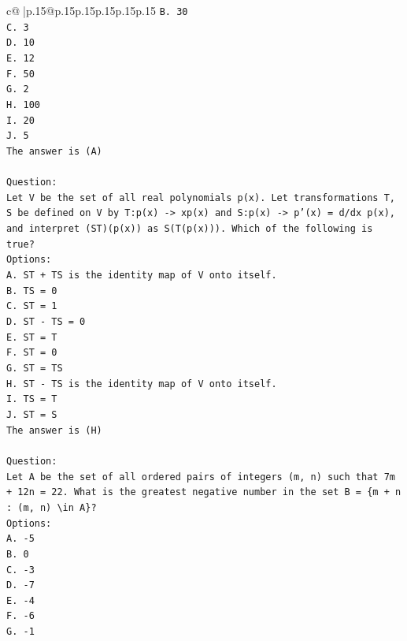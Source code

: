 \documentclass{article}
\begin{document}
{\begin{supertabular}{c@{$\;$}|p{.15\linewidth}@{}p{.15\linewidth}p{.15\linewidth}p{.15\linewidth}p{.15\linewidth}p{.15\linewidth}}
{{{\texttt{B. 30} \\
\texttt{C. 3} \\
\texttt{D. 10} \\
\texttt{E. 12} \\
\texttt{F. 50} \\
\texttt{G. 2} \\
\texttt{H. 100} \\
\texttt{I. 20} \\
\texttt{J. 5} \\
\texttt{The answer is (A)} \\
\\ 
\texttt{Question:} \\
\texttt{Let V be the set of all real polynomials p(x). Let transformations T, S be defined on V by T:p(x) {-}> xp(x) and S:p(x) {-}> p'(x) = d/dx p(x), and interpret (ST)(p(x)) as S(T(p(x))). Which of the following is true?} \\
\texttt{Options:} \\
\texttt{A. ST + TS is the identity map of V onto itself.} \\
\texttt{B. TS = 0} \\
\texttt{C. ST = 1} \\
\texttt{D. ST {-} TS = 0} \\
\texttt{E. ST = T} \\
\texttt{F. ST = 0} \\
\texttt{G. ST = TS} \\
\texttt{H. ST {-} TS is the identity map of V onto itself.} \\
\texttt{I. TS = T} \\
\texttt{J. ST = S} \\
\texttt{The answer is (H)} \\
\\ 
\texttt{Question:} \\
\texttt{Let A be the set of all ordered pairs of integers (m, n) such that 7m + 12n = 22. What is the greatest negative number in the set B = \{m + n : (m, n) \textbackslash{}in A\}?} \\
\texttt{Options:} \\
\texttt{A. {-}5} \\
\texttt{B. 0} \\
\texttt{C. {-}3} \\
\texttt{D. {-}7} \\
\texttt{E. {-}4} \\
\texttt{F. {-}6} \\
\texttt{G. {-}1} \\
}}}
\end{supertabular}}
\end{document}
